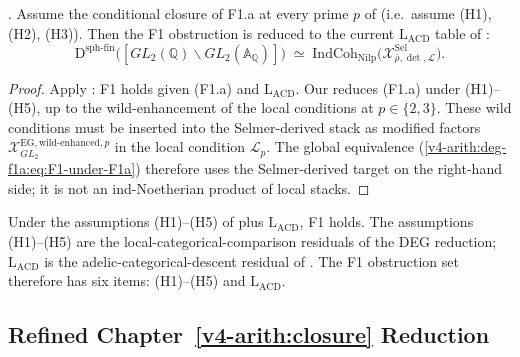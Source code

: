 \begin{theorem}
\label{v4-arith:deg-f1a:thm:F1-adelic-check}
\ClaimStatusProvedHereConditional. Assume the conditional closure of F1.a at
every prime \(p\) of
 (i.e.\ assume (H1),
(H2), (H3)). Then the F1 obstruction is reduced to the current
\(\mathrm{L}_{\mathrm{ACD}}\) table of
:
\begin{equation}
\label{v4-arith:deg-f1a:eq:F1-under-F1a}
\mathrm{D}^{\mathrm{sph\text{-}fin}}\bigl([GL_{2}(\mathbb{Q})\backslash GL_{2}(\mathbb{A}_{\mathbb{Q}})]\bigr)\;\simeq\;\mathrm{IndCoh}_{\mathrm{Nilp}}\bigl(\mathcal{X}^{\mathrm{Sel}}_{\bar\rho,\det,\mathcal{L}}\bigr).
\end{equation}
\end{theorem}

\begin{proof}
Apply : F1 holds given
(F1.a) and \(\mathrm{L}_{\mathrm{ACD}}\). Our
 reduces (F1.a) under
(H1)--(H5), up to the wild-enhancement of the local conditions
at \(p\in\{2,3\}\). These wild conditions must be inserted into the
Selmer-derived stack as modified factors
\(\mathcal{X}^{\mathrm{EG,wild\text{-}enhanced},p}_{GL_{2}}\) in the
local condition \(\mathcal{L}_{p}\). The global equivalence
(\ref{v4-arith:deg-f1a:eq:F1-under-F1a}) therefore uses the
Selmer-derived target on the right-hand side; it is not an
ind-Noetherian product of local stacks.
\end{proof}

\begin{remark}
\label{v4-arith:deg-f1a:rem:global-three-pieces}
Under the assumptions (H1)--(H5) of
 plus
\(\mathrm{L}_{\mathrm{ACD}}\), F1 holds. The assumptions
(H1)--(H5) are the local-categorical-comparison residuals
of the DEG reduction; \(\mathrm{L}_{\mathrm{ACD}}\) is the adelic-categorical-descent
residual of . The F1 obstruction
set therefore has six items: (H1)--(H5) and
\(\mathrm{L}_{\mathrm{ACD}}\).
\end{remark}

\subsection{Refined Chapter~\ref{v4-arith:closure} Reduction}

